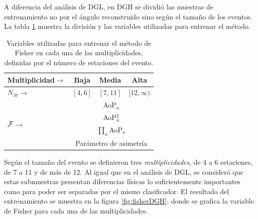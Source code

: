 	A diferencia del análisis de DGL, en DGH se dividió las muestras de entrenamiento no por el ángulo reconstruido sino según el tamaño de los eventos.
	La tabla \ref{tab:fisherDGH} muestra la división y las variables utilizadas para entrenar el método.
	\begin{table}[h!]
		\begin{center}
		\renewcommand{\arraystretch}{1.4}
		\footnotesize
			\begin{tabular}{|l|c|c|c|}
			\hline
			Multiplicidad\hfill$\rightarrow$& Baja & Media & Alta \\
			\hline
			$N_{St}$\hfill$\rightarrow$ & $[4,6]$ & $[7,11]$ & $[12,\infty)$ \\
			\hline
			\multirow{4}{*}{$\cal{F}$\hspace*{25mm}$\rightarrow$}  & \multicolumn{3}{c|}{AoP$_n$} \\
			                 & \multicolumn{3}{c|}{AoP$^2_n$} \\
			                 & \multicolumn{3}{c|}{$\prod_n$AoP$_n$} \\
			                 & \multicolumn{3}{c|}{Parámetro de asimetría} \\
			\hline
			\end{tabular}
			\caption{\label{tab:fisherDGH}
			Variables utilizadas para entrenar el método de Fisher en cada una de las multiplicidades, definidas por el número de estaciones del evento.}
		\end{center}	 
	\end{table}
	Según el tamaño del evento se definieron tres \emph{multiplicidades}, de 4 a 6 estaciones, de 7 a 11 y de más de 12.
	Al igual que en el análisis de DGL, se consideró que estas submuestras presentan diferencias físicas lo suficientemente importantes como para poder ser separadas por el mismo clasificador.
	El resultado del entrenamiento se muestra en la figura \ref{fig:fisherDGH}, donde se grafica la variable de Fisher para cada una de las multiplicidades.
